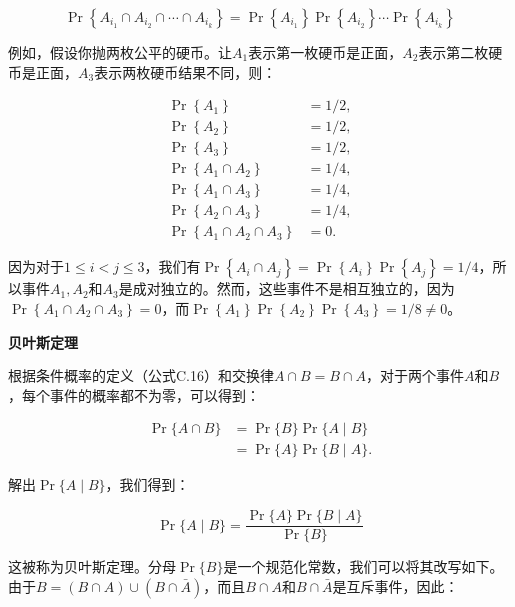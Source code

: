 \documentclass[lang=cn,newtx,10pt,scheme=chinese]{elegantbook}
\begin{document}
$$
\operatorname{Pr}\left\{A_{i_1} \cap A_{i_2} \cap \cdots \cap A_{i_k}\right\}=\operatorname{Pr}\left\{A_{i_1}\right\} \operatorname{Pr}\left\{A_{i_2}\right\} \cdots \operatorname{Pr}\left\{A_{i_k}\right\}
$$

例如，假设你抛两枚公平的硬币。让$A_1$表示第一枚硬币是正面，$A_2$表示第二枚硬币是正面，$A_3$表示两枚硬币结果不同，则：

$$
\begin{aligned}
\operatorname{Pr}\left\{A_1\right\} & =1 / 2, \\
\operatorname{Pr}\left\{A_2\right\} & =1 / 2, \\
\operatorname{Pr}\left\{A_3\right\} & =1 / 2, \\
\operatorname{Pr}\left\{A_1 \cap A_2\right\} & =1 / 4, \\
\operatorname{Pr}\left\{A_1 \cap A_3\right\} & =1 / 4, \\
\operatorname{Pr}\left\{A_2 \cap A_3\right\} & =1 / 4, \\
\operatorname{Pr}\left\{A_1 \cap A_2 \cap A_3\right\} & =0 .
\end{aligned}
$$

因为对于$1 \leq i<j \leq 3$，我们有$\operatorname{Pr}\left\{A_i \cap A_j\right\}=\operatorname{Pr}\left\{A_i\right\} \operatorname{Pr}\left\{A_j\right\}=1 / 4$，所以事件$A_1, A_2$和$A_3$是成对独立的。然而，这些事件不是相互独立的，因为$\operatorname{Pr}\left\{A_1 \cap A_2 \cap A_3\right\}=0$，而$\operatorname{Pr}\left\{A_1\right\} \operatorname{Pr}\left\{A_2\right\} \operatorname{Pr}\left\{A_3\right\}=1 / 8 \neq 0$。

\textbf{贝叶斯定理}

根据条件概率的定义（公式C.16）和交换律$A \cap B=B \cap A$，对于两个事件$A$和$B$，每个事件的概率都不为零，可以得到：

$$
\begin{aligned}
\operatorname{Pr}\{A \cap B\} & =\operatorname{Pr}\{B\} \operatorname{Pr}\{A \mid B\} \\
& =\operatorname{Pr}\{A\} \operatorname{Pr}\{B \mid A\} .
\end{aligned}
$$

解出$\operatorname{Pr}\{A \mid B\}$，我们得到：

$$
\operatorname{Pr}\{A \mid B\}=\frac{\operatorname{Pr}\{A\} \operatorname{Pr}\{B \mid A\}}{\operatorname{Pr}\{B\}}
$$

这被称为贝叶斯定理。分母$\operatorname{Pr}\{B\}$是一个规范化常数，我们可以将其改写如下。由于$B=(B \cap A) \cup(B \cap \bar{A})$，而且$B \cap A$和$B \cap \bar{A}$是互斥事件，因此：
\end{document}
